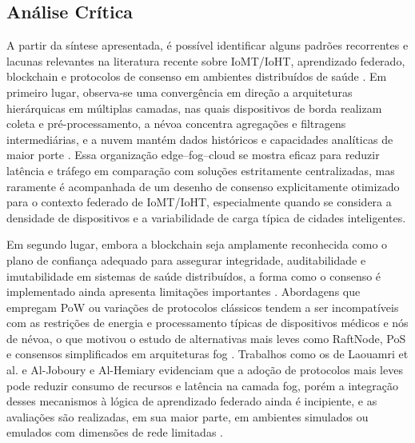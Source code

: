 \documentclass[12pt]{article}
\begin{document}
\subsection{Análise Crítica}

A partir da síntese apresentada, é possível identificar alguns padrões recorrentes e lacunas relevantes na literatura recente sobre IoMT/IoHT, aprendizado federado, blockchain e protocolos de consenso em ambientes distribuídos de saúde \cite{rajagopal2025,cheikhrouhou2023,laouamri2025,murthy2026,ren2024,tripathy2024,ahmad2023,kamruzzaman2022,alam2022,baucas2023,aljoboury2020}. Em primeiro lugar, observa-se uma convergência em direção a arquiteturas hierárquicas em múltiplas camadas, nas quais dispositivos de borda realizam coleta e pré-processamento, a névoa concentra agregações e filtragens intermediárias, e a nuvem mantém dados históricos e capacidades analíticas de maior porte \cite{rajagopal2025,tripathy2024,ahmad2023,kamruzzaman2022,alam2022}. Essa organização edge–fog–cloud se mostra eficaz para reduzir latência e tráfego em comparação com soluções estritamente centralizadas, mas raramente é acompanhada de um desenho de consenso explicitamente otimizado para o contexto federado de IoMT/IoHT, especialmente quando se considera a densidade de dispositivos e a variabilidade de carga típica de cidades inteligentes.

Em segundo lugar, embora a blockchain seja amplamente reconhecida como o plano de confiança adequado para assegurar integridade, auditabilidade e imutabilidade em sistemas de saúde distribuídos, a forma como o consenso é implementado ainda apresenta limitações importantes \cite{ahmad2023,kamruzzaman2022,alam2022,baucas2023}. Abordagens que empregam PoW ou variações de protocolos clássicos tendem a ser incompatíveis com as restrições de energia e processamento típicas de dispositivos médicos e nós de névoa, o que motivou o estudo de alternativas mais leves como RaftNode, PoS e consensos simplificados em arquiteturas fog \cite{laouamri2025,aljoboury2020,cheikhrouhou2023}. Trabalhos como os de Laouamri et al. e Al-Joboury e Al-Hemiary evidenciam que a adoção de protocolos mais leves pode reduzir consumo de recursos e latência na camada fog, porém a integração desses mecanismos à lógica de aprendizado federado ainda é incipiente, e as avaliações são realizadas, em sua maior parte, em ambientes simulados ou emulados com dimensões de rede limitadas \cite{laouamri2025,aljoboury2020}.
\end{document}
